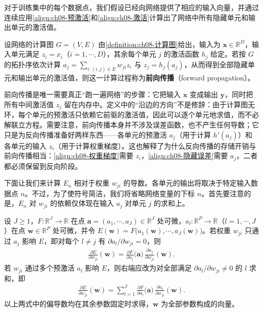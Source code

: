 \documentclass[../../main.tex]{subfiles}
\begin{document}
对于训练集中的每个数据点，我们假设已经向网络提供了相应的输入向量，并通过连续应用\eqref{align:ch08-预激活}和\eqref{align:ch08-激活}计算出了网络中所有隐藏单元和输出单元的激活值。

\begin{definition}[前向传播]\label{definition:ch08-前向传播}
设网络的计算图 $G=(V,E)$ 由\cref{definition:ch08-计算图}给出，输入为 $\mathbf{x}\in\mathbb{R}^{D}$，输入单元满足 $z_i=x_i$（$i=1,\cdots,D$），其余每个单元 $j$ 的激活函数 $h_j$ 给定。若按 $G$ 的拓扑序依次计算 $a_j=\sum_{i:(i,j)\in E}w_{ji}z_i$ 与 $z_j=h_j(a_j)$，从而得到全部隐藏单元和输出单元的激活值，则这一计算过程称为\textbf{前向传播}（forward propagation）。
\end{definition}

\begin{remark}
前向传播是唯一需要真正“跑一遍网络”的步骤：它把输入 $\mathbf{x}$ 变成输出 $\mathbf{y}$，同时把所有中间激活值 $z_j$ 留在内存中。定义中的“沿边的方向”不是修辞：由于计算图无环，每个单元的预激活只依赖它前驱的激活值，因此可以逐个单元地求值，而不必解联立方程。需要注意，前向传播本身并不涉及误差函数，也不产生任何导数；它只是为反向传播准备好两样东西——各单元的预激活 $a_j$（用于计算 $h'(a_j)$）和各单元的输入 $z_i$（用于计算权重梯度）。这也解释了为什么反向传播的存储开销与前向传播相当：\eqref{align:ch08-权重梯度}需要 $z_i$，\eqref{align:ch08-隐藏误差}需要 $a_j$，二者都必须保留到反向阶段。
\end{remark}

下面让我们来计算 $E_n$ 相对于权重 $w_{ji}$ 的导数。各单元的输出将取决于特定输入数据点 $n$。不过，为了使符号简洁，我们将省略网络变量的下标 $n$。首先要注意的是，$E_n$ 对 $w_{ji}$ 的依赖仅体现在输入 $a_j$ 对单元 $j$ 的求和上。

\begin{proposition}[偏导数的链式法则]\label{proposition:ch08-链式法则}
设 $J\geqslant1$，$F:\mathbb{R}^{J}\to\mathbb{R}$ 在点 $\mathbf{a}=(a_1,\cdots,a_J)\in\mathbb{R}^{J}$ 处可微，$a_l:\mathbb{R}^{P}\to\mathbb{R}$（$l=1,\cdots,J$）在点 $\mathbf{w}\in\mathbb{R}^{P}$ 处可微，并令 $E(\mathbf{w})=F\bigl(a_1(\mathbf{w}),\cdots,a_J(\mathbf{w})\bigr)$。若权重 $w_{ji}$ 只通过 $a_j$ 影响 $E$，即对每个 $l\neq j$ 有 $\partial a_l/\partial w_{ji}=0$，则
\begin{align}
\frac{\partial E}{\partial w_{ji}}(\mathbf{w})=\frac{\partial F}{\partial a_j}\bigl(\mathbf{a}\bigr)\,\frac{\partial a_j}{\partial w_{ji}}(\mathbf{w}).
\label{align:ch08-链式法则}
\end{align}
若 $w_{ji}$ 通过多个预激活 $a_l$ 影响 $E$，则右端应改为对全部满足 $\partial a_l/\partial w_{ji}\neq0$ 的 $l$ 求和，即
\begin{align*}
\frac{\partial E}{\partial w_{ji}}(\mathbf{w})=\sum_{l=1}^{J}\frac{\partial F}{\partial a_l}\bigl(\mathbf{a}\bigr)\,\frac{\partial a_l}{\partial w_{ji}}(\mathbf{w}).
\end{align*}
以上两式中的偏导数均在其余参数固定时求得，$\mathbf{w}$ 为全部参数构成的向量。
\end{proposition}
\end{document}
